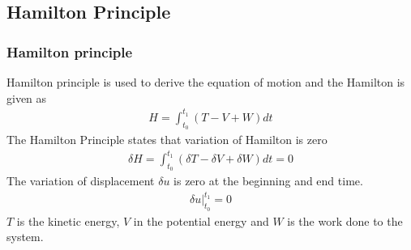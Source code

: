 \documentclass[9pt]{beamer}
\begin{document}

\subsection{Hamilton Principle}
\begin{frame}
\frametitle{Hamilton principle}
Hamilton principle is used to derive the equation of motion
and the Hamilton is given as 
 \begin{align*}
H  = \int_{t_0}^{t_1} \left( T - V + W \right) dt  
 \end{align*}
 The Hamilton Principle states that variation of Hamilton is zero
 \begin{align*}
 \delta H  =  \int_{t_0}^{t_1} \left( \delta T - \delta V + \delta W \right) dt     =  0 
 \end{align*}
 The variation of displacement $\delta u$ is zero at the beginning and end time.
 \begin{align*}
 \delta u \Big|_{t_0}^{t_1} = 0
 \end{align*}
 $T$ is the kinetic energy, $V$ in the potential energy and $W$ is the work done to the system.
 
\end{frame}
\end{document}
